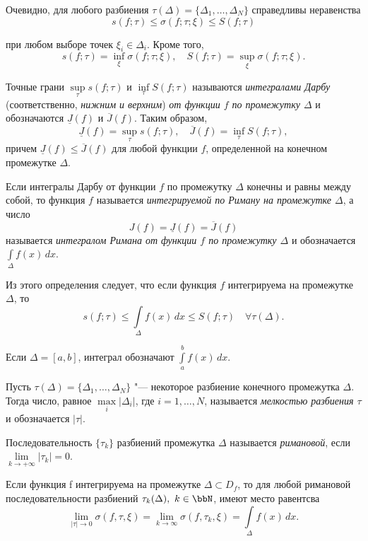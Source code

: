 Очевидно, для любого разбиения $\tau(\Delta) = \{ \Delta_1, \ldots, \Delta_N\}$ справедливы неравенства
$$
s(f; \tau) \le \sigma(f; \tau; \xi) \le S(f; \tau)
$$

при любом выборе точек $\xi_i \in \Delta_i$. Кроме того,
$$
s(f; \tau) = \inf_{\xi} \sigma(f; \tau; \xi), \quad S(f; \tau) = \sup_{\xi} \sigma(f; \tau; \xi).
$$

\begin{defn}
Точные грани $\sup\limits_{\tau} s(f; \tau)$ и $\inf\limits_{\tau} S(f; \tau)$ называются \textit{интегралами Дарбу} (соответственно, \textit{нижним и верхним}) \textit{от функции $f$ по промежутку $\Delta$} и обозначаются $\underline{J}(f)$ и $\overline{J}(f)$. Таким образом,
$$
\underline{J}(f) = \sup_{\tau} s(f; \tau), \quad \overline{J}(f) = \inf_{\tau} S(f; \tau),
$$
причем $\underline{J}(f) \le \overline{J}(f)$ для любой функции $f$, определенной на конечном промежутке 
$\Delta$.
\end{defn}


\begin{defn}
Если интегралы Дарбу от функции $f$ по промежутку $\Delta$ конечны и равны между собой, то функция $f$ называется \textit{интегрируемой по Риману на промежутке $\Delta$}, а число
$$
J(f) = \underline{J}(f) = \overline{J}(f)
$$
называется \textit{интегралом Римана от функции $f$ по промежутку $\Delta$} и обозначается $\int\limits_{\Delta} f(x) \,dx$.
\end{defn}

Из этого определения следует, что если функция $f$ интегрируема на промежутке $\Delta$, то
$$
s(f; \tau) \le \int\limits_{\Delta} f(x) \,dx \le S(f; \tau) \quad \forall \tau(\Delta).
$$

Если $\Delta = [a, b]$, интеграл обозначают $\int\limits_{a}^{b} f(x) \,dx$.

\begin{defn}
Пусть $\tau(\Delta) = \{ \Delta_1, \ldots, \Delta_N\}$ "--- некоторое разбиение конечного промежутка $\Delta$. Тогда число, равное $\max\limits_i|\Delta_i|$, где $i=1,\ldots,N$, называется \textit{мелкостью разбиения $\tau$} и обозначается $|\tau|$.
\end{defn}

\begin{defn}
Последовательность $\{\tau_k\}$ разбиений промежутка $\Delta$ называется \textit{римановой}, если $\lim\limits_{k \to +\infty}|\tau_k|=0$.
\end{defn}

\begin{thm} \label{ch11.1thm1}
Если функция f интегрируема на промежутке $\Delta \subset D_f$, то для любой римановой последовательности разбиений $\tau_k(\Delta),\ k\in \bbN$, имеют место равентсва
\begin{equation} \label{ch11.1eq1}
\lim_{|\tau| \to 0} \sigma(f, \tau, \xi) = \lim_{k \to \infty} \sigma(f, \tau_k, \xi) = \int\limits_{\Delta} f(x) \,dx.
\end{equation}
\end{thm}

